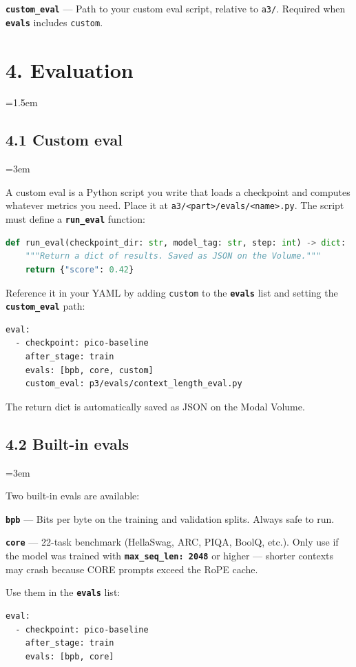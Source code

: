\documentclass[9pt]{extarticle}
\newcommand{\cmd}[1]{\colorbox{gray!10}{\texttt{#1}}}
\newcommand{\field}[1]{\texttt{\textbf{#1}}}
\begin{document}
\field{custom\_eval} --- Path to your custom eval script, relative to \cmd{a3/}. Required when \field{evals} includes \cmd{custom}.

\leftskip=0pt
\section*{4. Evaluation}
\leftskip=1.5em

\subsection*{4.1 Custom eval}
\leftskip=3em

A custom eval is a Python script you write that loads a checkpoint and computes whatever metrics you need. Place it at \cmd{a3/<part>/evals/<name>.py}. The script must define a \field{run\_eval} function:

\begin{lstlisting}[language=Python]
def run_eval(checkpoint_dir: str, model_tag: str, step: int) -> dict:
    """Return a dict of results. Saved as JSON on the Volume."""
    return {"score": 0.42}
\end{lstlisting}

Reference it in your YAML by adding \cmd{custom} to the \field{evals} list and setting the \field{custom\_eval} path:

\begin{lstlisting}
eval:
  - checkpoint: pico-baseline
    after_stage: train
    evals: [bpb, core, custom]
    custom_eval: p3/evals/context_length_eval.py
\end{lstlisting}

The return dict is automatically saved as JSON on the Modal Volume.

\subsection*{4.2 Built-in evals}
\leftskip=3em

Two built-in evals are available:

\field{bpb} --- Bits per byte on the training and validation splits. Always safe to run.

\field{core} --- 22-task benchmark (HellaSwag, ARC, PIQA, BoolQ, etc.). Only use if the model was trained with \field{max\_seq\_len: 2048} or higher --- shorter contexts may crash because CORE prompts exceed the RoPE cache.

Use them in the \field{evals} list:

\begin{lstlisting}
eval:
  - checkpoint: pico-baseline
    after_stage: train
    evals: [bpb, core]
\end{lstlisting}
\end{document}
